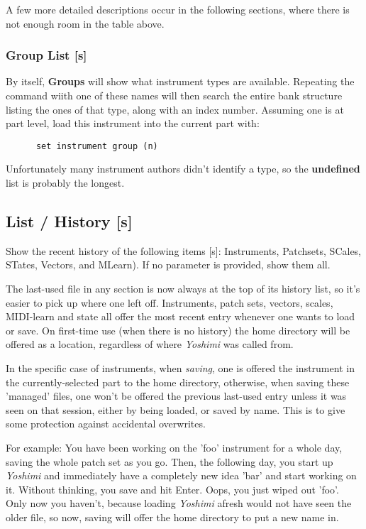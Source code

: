 A few more detailed descriptions occur in the following sections, where there
is not enough room in the table above.

\subsubsection{Group List [s]}
\label{subsec:command_line_instrument_group_list}
   By itself, \textbf{Groups} will show what instrument types are available.
   Repeating the command wiith one of these names will then search the entire
   bank structure listing the ones of that type, along with an index number.
   Assuming one is at part level, load this instrument into the current part with:
   \begin{verbatim}
      set instrument group (n)
   \end{verbatim}

   Unfortunately many instrument authors didn't identify a type, so the
   \textbf{undefined} list is probably the longest.

\subsection{List / History [s]}
\label{subsec:command_line_list_history}

   Show the recent history of the following items [s]:
   Instruments, Patchsets, SCales, STates, Vectors, and MLearn).
   If no parameter is provided, show them all.

   The last-used file in any section is now always at the top of its history list,
   so it's easier to pick up where one left off.
   Instruments, patch sets, vectors, scales, MIDI-learn and state all offer the
   most recent entry whenever one wants to load or save.  On first-time use (when
   there is no history) the home directory will be offered as a location,
   regardless of where \textsl{Yoshimi} was called from.

   In the specific case of instruments, when \textsl{saving},
   one is offered the instrument in the currently-selected part to the home
   directory, otherwise, when saving these 'managed' files,
   one won't be offered the previous last-used entry unless it was seen on that
   session, either by being loaded, or saved by name. This is to give some
   protection against accidental overwrites.

   For example:
   You have been working on the 'foo' instrument
   for a whole day, saving the whole patch set as you
   go. Then, the following day, you start up \textsl{Yoshimi}
   and immediately have a completely
   new idea 'bar' and start working on it. Without thinking, you save and hit
   Enter. Oops, you just wiped out 'foo'.
   Only now you haven't, because loading \textsl{Yoshimi}
   afresh would not have seen the older file, so now, saving
   will offer the home directory to put a new name in.

